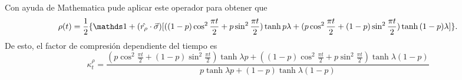 Con ayuda de Mathematica pude aplicar este operador para obtener que
\begin{equation}
  \rho(t)=\frac{1}{2}\{\Id+(\hat{r_{\rho}}\cdot\vec{\sigma})[((1-p)\cos^{2}{\frac{\pi t}{2}}+p\sin^{2}{\frac{\pi t}{2}})\tanh{p\lambda}+(p\cos^{2}{\frac{\pi t}{2}}+(1-p)\sin^{2}{\frac{\pi t}{2}})\tanh{(1-p)\lambda}]\}.
\end{equation}
De esto, el factor de compresión dependiente del tiempo es
\begin{equation}\label{eq:SWAPFactort}
  \kappa_{t}^{\rho}=\frac{(p\cos^{2}{\frac{\pi t}{2}}+(1-p)\sin^{2}{\frac{\pi t}{2}})\tanh{\lambda p}+((1-p)\cos^{2}{\frac{\pi t}{2}}+p\sin^{2}{\frac{\pi t}{2}})\tanh{\lambda (1-p)}}{
    p\tanh{\lambda p}+(1-p)\tanh{\lambda (1-p)}}
\end{equation}

